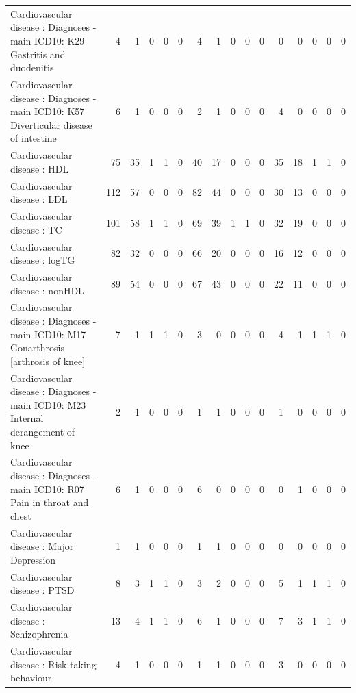 \begin{table}[ht]
\begin{tabular}{lrrrrrrrrrrrrrrr}
  Cardiovascular disease : Diagnoses - main ICD10: K29 Gastritis and duodenitis &   4 &   1 &   0 &   0 &   0 &   4 &   1 &   0 &   0 &   0 &   0 &   0 &   0 &   0 &   0 \\ 
  Cardiovascular disease : Diagnoses - main ICD10: K57 Diverticular disease of intestine &   6 &   1 &   0 &   0 &   0 &   2 &   1 &   0 &   0 &   0 &   4 &   0 &   0 &   0 &   0 \\ 
  Cardiovascular disease : HDL &  75 &  35 &   1 &   1 &   0 &  40 &  17 &   0 &   0 &   0 &  35 &  18 &   1 &   1 &   0 \\ 
  Cardiovascular disease : LDL & 112 &  57 &   0 &   0 &   0 &  82 &  44 &   0 &   0 &   0 &  30 &  13 &   0 &   0 &   0 \\ 
  Cardiovascular disease : TC & 101 &  58 &   1 &   1 &   0 &  69 &  39 &   1 &   1 &   0 &  32 &  19 &   0 &   0 &   0 \\ 
  Cardiovascular disease : logTG &  82 &  32 &   0 &   0 &   0 &  66 &  20 &   0 &   0 &   0 &  16 &  12 &   0 &   0 &   0 \\ 
  Cardiovascular disease : nonHDL &  89 &  54 &   0 &   0 &   0 &  67 &  43 &   0 &   0 &   0 &  22 &  11 &   0 &   0 &   0 \\ 
  Cardiovascular disease : Diagnoses - main ICD10: M17 Gonarthrosis [arthrosis of knee] &   7 &   1 &   1 &   1 &   0 &   3 &   0 &   0 &   0 &   0 &   4 &   1 &   1 &   1 &   0 \\ 
  Cardiovascular disease : Diagnoses - main ICD10: M23 Internal derangement of knee &   2 &   1 &   0 &   0 &   0 &   1 &   1 &   0 &   0 &   0 &   1 &   0 &   0 &   0 &   0 \\ 
  Cardiovascular disease : Diagnoses - main ICD10: R07 Pain in throat and chest &   6 &   1 &   0 &   0 &   0 &   6 &   0 &   0 &   0 &   0 &   0 &   1 &   0 &   0 &   0 \\ 
  Cardiovascular disease : Major Depression &   1 &   1 &   0 &   0 &   0 &   1 &   1 &   0 &   0 &   0 &   0 &   0 &   0 &   0 &   0 \\ 
  Cardiovascular disease : PTSD &   8 &   3 &   1 &   1 &   0 &   3 &   2 &   0 &   0 &   0 &   5 &   1 &   1 &   1 &   0 \\ 
  Cardiovascular disease : Schizophrenia &  13 &   4 &   1 &   1 &   0 &   6 &   1 &   0 &   0 &   0 &   7 &   3 &   1 &   1 &   0 \\ 
  Cardiovascular disease : Risk-taking behaviour &   4 &   1 &   0 &   0 &   0 &   1 &   1 &   0 &   0 &   0 &   3 &   0 &   0 &   0 &   0 \\ 

\end{tabular}
\end{table}

